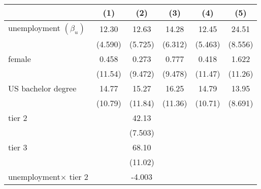 \begin{table}[htbp]\centering
	\label{tb:table3}
	\begin{adjustbox}{max width=0.6\textwidth}
\begin{tabular}{l*{5}{c}}
\hline\hline
            &\multicolumn{1}{c}{(1)}&\multicolumn{1}{c}{(2)}&\multicolumn{1}{c}{(3)}&\multicolumn{1}{c}{(4)}&\multicolumn{1}{c}{(5)}\\
\hline
unemployment $\left( \beta_u \right)$     &       12.30\sym{**} &       12.63\sym{*}  &       14.28\sym{*}  &       12.45\sym{*}  &       24.51\sym{**} \\
            &     (4.590)         &     (5.725)         &     (6.312)         &     (5.463)         &     (8.556)         \\
[1em]
female &       0.458         &       0.273         &       0.777         &       0.418         &       1.622         \\
            &     (11.54)         &     (9.472)         &     (9.478)         &     (11.47)         &     (11.26)         \\
[1em]
US bachelor degree   &       14.77         &       15.27         &       16.25         &       14.79         &       13.95         \\
            &     (10.79)         &     (11.84)         &     (11.36)         &     (10.71)         &     (8.691)         \\
[1em]
tier 2     &                     &       42.13\sym{***}&                     &                     &                     \\
            &                     &     (7.503)         &                     &                     &                     \\
[1em]
tier 3     &                     &       68.10\sym{***}&                     &                     &                     \\
            &                     &     (11.02)         &                     &                     &                     \\
[1em]
unemployment$\times$ tier 2 &                     &      -4.003         &                     &                     &                     \\

\end{tabular}
\end{adjustbox}
\end{table}
